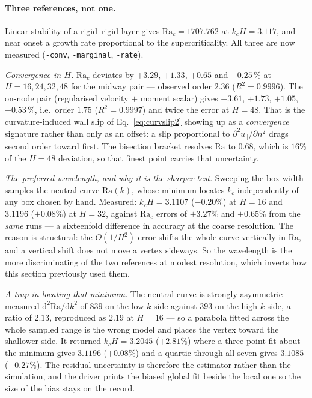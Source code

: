 \documentclass[11pt,a4paper]{article}
\newcommand{\code}[1]{\texttt{\small #1}}
\begin{document}
\paragraph{Three references, not one.} Linear stability of a rigid--rigid layer
gives $\mathrm{Ra}_c=1707.762$ at $k_cH=3.117$, and near onset a growth rate
proportional to the supercriticality. All three are now measured
(\code{-conv}, \code{-marginal}, \code{-rate}).

\emph{Convergence in $H$.} $\mathrm{Ra}_c$ deviates by $+3.29$, $+1.33$, $+0.65$
and $+0.25$\,\% at $H=16,24,32,48$ for the midway pair --- observed order
$2.36$ ($R^2=0.9996$). The on-node pair (regularised velocity $+$ moment scalar)
gives $+3.61$, $+1.73$, $+1.05$, $+0.53$\,\%, i.e.\ order $1.75$ ($R^2=0.9997$)
and twice the error at $H=48$. That is the curvature-induced wall slip of
Eq.~\eqref{eq:curvslip2} showing up as a \emph{convergence} signature rather
than only as an offset: a slip proportional to
$\partial^2u_\parallel/\partial n^2$ drags second order toward first. The
bisection bracket resolves $\mathrm{Ra}$ to $0.68$, which is $16\%$ of the
$H=48$ deviation, so that finest point carries that uncertainty.

\emph{The preferred wavelength, and why it is the sharper test.} Sweeping the
box width samples the neutral curve $\mathrm{Ra}(k)$, whose minimum locates
$k_c$ independently of any box chosen by hand. Measured: $k_cH=3.1107$
($-0.20\%$) at $H=16$ and $3.1196$ ($+0.08\%$) at $H=32$, against
$\mathrm{Ra}_c$ errors of $+3.27\%$ and $+0.65\%$ from the \emph{same} runs ---
a sixteenfold difference in accuracy at the coarse resolution. The reason is
structural: the $O(1/H^2)$ error shifts the whole curve vertically in
$\mathrm{Ra}$, and a vertical shift does not move a vertex sideways. So the
wavelength is the more discriminating of the two references at modest
resolution, which inverts how this section previously used them.

\emph{A trap in locating that minimum.} The neutral curve is strongly
asymmetric --- measured $\mathrm{d}^2\mathrm{Ra}/\mathrm{d}k^2$ of $839$ on the
low-$k$ side against $393$ on the high-$k$ side, a ratio of $2.13$, reproduced
as $2.19$ at $H=16$ --- so a parabola fitted across the whole sampled range is
the wrong model and places the vertex toward the shallower side. It returned
$k_cH=3.2045$ ($+2.81\%$) where a three-point fit about the minimum gives
$3.1196$ ($+0.08\%$) and a quartic through all seven gives $3.1085$
($-0.27\%$). The residual uncertainty is therefore the estimator rather than the
simulation, and the driver prints the biased global fit beside the local one so
the size of the bias stays on the record.
\end{document}
